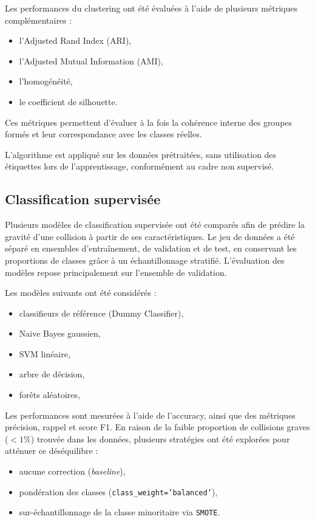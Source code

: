 \documentclass[11pt]{article}
\begin{document}
Les performances du clustering ont été évaluées à l’aide de plusieurs métriques complémentaires :
\begin{itemize}
    \item l’Adjusted Rand Index (ARI),
    \item l’Adjusted Mutual Information (AMI),
    \item l’homogénéité,
    \item le coefficient de silhouette.
\end{itemize}

Ces métriques permettent d’évaluer à la fois la cohérence interne des groupes formés et leur correspondance avec les classes réelles.

L’algorithme est appliqué sur les données prétraitées, sans utilisation des étiquettes lors de l’apprentissage, conformément au cadre non supervisé.
 
\subsection{Classification supervisée}

 Plusieurs modèles de classification supervisée ont été comparés afin de prédire la gravité d’une collision à partir de ses caractéristiques.
Le jeu de données a été séparé en ensembles d’entraînement, de validation et de test, en conservant les proportions de classes grâce à un échantillonnage stratifié. L’évaluation des modèles repose principalement sur l’ensemble de validation.

Les modèles suivants ont été considérés :
\begin{itemize}
    \item classifieurs de référence (Dummy Classifier),
    \item Naive Bayes gaussien,
    \item SVM linéaire,
    \item arbre de décision,
    \item forêts aléatoires,
\end{itemize}

Les performances sont mesurées à l’aide de l’accuracy, ainsi que des métriques précision, rappel et score F1. En raison de la faible proportion de collisions graves ($<1\%$) trouvée dans les données, plusieurs stratégies ont été explorées pour atténuer ce déséquilibre :
\begin{itemize}
    \item aucune correction (\textit{baseline}),
    \item pondération des classes (\texttt{class\_weight='balanced'}),
    \item sur-échantillonnage de la classe minoritaire via \texttt{SMOTE}.
\end{itemize}
 
\end{document}
